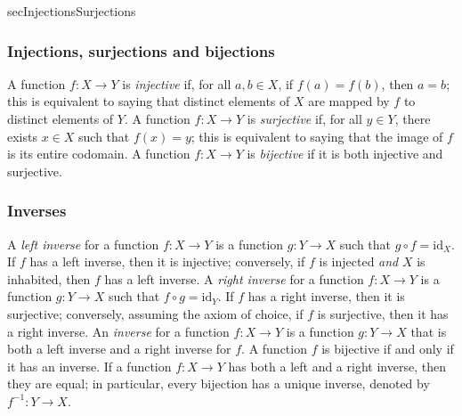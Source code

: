 \begin{tldr}{secInjectionsSurjections}

\subsubsection*{Injections, surjections and bijections}

\begin{tldrlist}
 A function $f : X \to Y$ is \textit{injective} if, for all $a,b \in X$, if $f(a)=f(b)$, then $a=b$; this is equivalent to saying that distinct elements of $X$ are mapped by $f$ to distinct elements of $Y$.
 A function $f : X \to Y$ is \textit{surjective} if, for all $y \in Y$, there exists $x \in X$ such that $f(x)=y$; this is equivalent to saying that the image of $f$ is its entire codomain.
 A function $f : X \to Y$ is \textit{bijective} if it is both injective and surjective.
\end{tldrlist}

\subsubsection*{Inverses}

\begin{tldrlist}
 A \textit{left inverse} for a function $f : X \to Y$ is a function $g : Y \to X$ such that $g \circ f = \mathrm{id}_X$. If $f$ has a left inverse, then it is injective; conversely, if $f$ is injected \textit{and} $X$ is inhabited, then $f$ has a left inverse.
 A \textit{right inverse} for a function $f : X \to Y$ is a function $g : Y \to X$ such that $f \circ g = \mathrm{id}_Y$. If $f$ has a right inverse, then it is surjective; conversely, assuming the axiom of choice, if $f$ is surjective, then it has a right inverse.
 An \textit{inverse} for a function $f : X \to Y$ is a function $g : Y \to X$ that is both a left inverse and a right inverse for $f$. A function $f$ is bijective if and only if it has an inverse.
 If a function $f : X \to Y$ has both a left and a right inverse, then they are equal; in particular, every bijection has a unique inverse, denoted by $f^{-1} : Y \to X$.
\end{tldrlist}

\end{tldr}

